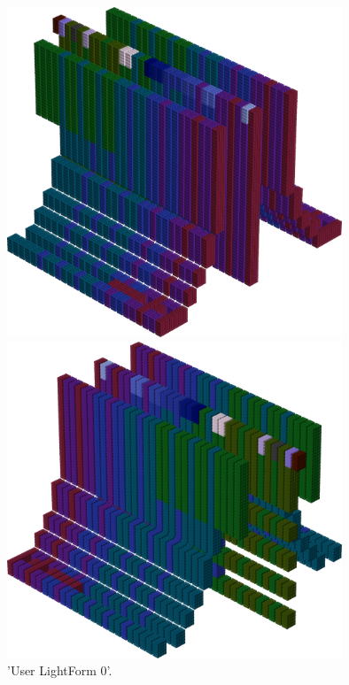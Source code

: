 %
\begin{minipage}[b]{0.48\linewidth}
\vspace{1cm}
\begin{figure}[H]
    \centering
    \begin{adjustbox}{width=4cm,margin=0cm 0cm}
      \includegraphics[width=10cm]{src/colorspace_patterns/pattern8-45.png}%
    \end{adjustbox}
    \begin{adjustbox}{width=4cm,margin=0cm 0cm}
      \includegraphics[width=10cm]{src/colorspace_patterns/pattern8-225.png}%
    \end{adjustbox}
\caption{'User LightForm 0'.}
\end{figure}
\end{minipage}
